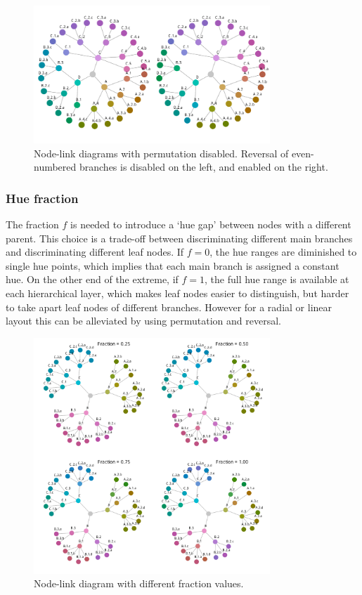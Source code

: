 \documentclass[review,journal]{vgtc}         %
\begin{document}
\begin{figure}[!b]

  \centering
  \includegraphics[width=3.5in]{HCPgraph2.pdf}
  \caption{Node-link diagrams with permutation disabled. Reversal of even-numbered branches is disabled on the left, and enabled on the right.}\label{fig:graph_noperm}

\end{figure}


\subsubsection{Hue fraction}\label{secf}

The fraction $f$ is needed to introduce a `hue gap' between nodes with a different parent. This choice is a trade-off between discriminating different main branches and discriminating different leaf nodes. If $f=0$, the hue ranges are diminished to single hue points, which implies that each main branch is assigned a constant hue. On the other end of the extreme, if $f=1$, the full hue range is available at each hierarchical layer, which makes leaf nodes easier to distinguish, but harder to take apart leaf nodes of different branches. However for a radial or linear layout this can be alleviated by using permutation and reversal.

\begin{figure}[tb]
  \centering
  \includegraphics[width=3.5in]{Graph_hue.pdf}
  \caption{Node-link diagram with different fraction values.}\label{fig:graphf}
\end{figure}
\end{document}
